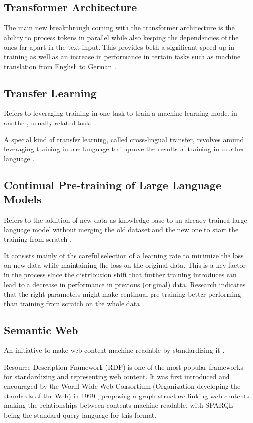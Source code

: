 \subsection{Transformer Architecture}


The main new breakthrough coming with the transformer architecture is the ability to process tokens in parallel while also keeping the dependencies of the ones far apart in the text input. This provides both a significant speed up in training as well as an increase in performance in certain tasks such as machine translation from English to German \cite{vaswani2017attention}.

\subsection{Transfer Learning}

Refers to leveraging training in one task to train a machine learning model in another, usually related task. \cite{torrey2010transfer}. 

A special kind of transfer learning, called cross-lingual transfer, revolves around leveraging training in one language to improve the results of training in another language \cite{cross_lingual_transfer}.

\subsection{Continual Pre-training of Large Language Models}
Refers to the addition of new data as knowledge base to an already trained large language model without merging the old dataset and the new one to start the training from scratch \cite{gupta2023continual}.

It consists mainly of the careful selection of a learning rate to minimize the loss on new data while maintaining the loss on the original data. This is a key factor in the process since the distribution shift that further training introduces can lead to a decrease in performance in previous (original) data. Research indicates that the right parameters might make continual pre-training better performing than training from scratch on the whole data \cite{gupta2023continual}.


\subsection{Semantic Web}

An initiative to make web content machine-readable by standardizing it \cite{pellegrini2006semantic}.

Resource Description Framework (RDF) is one of the most popular frameworks for standardizing and representing web content. It was first introduced and encouraged by the World Wide Web Consortium (Organization developing the standards of the Web) in 1999 \cite{dataeuropa_rdf_sparql}, proposing a graph structure linking web contents making the relationships between contents machine-readable, with SPARQL being the standard query language for this format.



